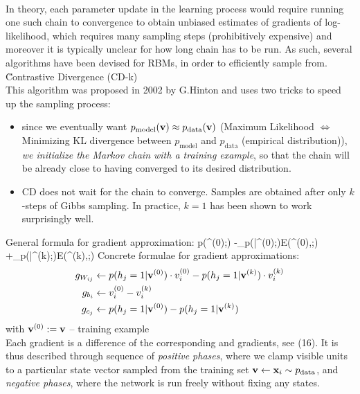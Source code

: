 \\[1em]
In theory, each parameter update in the learning process would require running one such chain to convergence to obtain unbiased estimates of gradients of log-likelihood, which requires many sampling steps (prohibitively expensive) and moreover it is typically unclear for how long chain has to be run. As such, several algorithms have been devised for RBMs, in order to efficiently sample from.
\\[1em]
\u{Contrastive Divergence} (CD-k)
\\
This algorithm was proposed in 2002 by G.Hinton and uses two tricks to speed up the sampling process:
\begin{itemize}
\item since we eventually want $p_{\text{model}}(\mathbf{v}) \approx p_{\text{data}}(\mathbf{v})$ (Maximum Likelihood $\Leftrightarrow$ Minimizing KL divergence between $p_{\text{model}}$ and $p_{\text{data}}$ (empirical distribution)), \emph{we initialize the Markov chain with a training example}, so that the chain will be already close to having converged to its desired distribution.
\item CD does not wait for the chain to converge. Samples are obtained after only $k$-steps of Gibbs sampling. In practice, $k=1$ has been shown to work surprisingly well.
\end{itemize}
General formula for gradient approximation:
\bg
\frac{\partial}{\partial\theta}\log p(^{(0)};\bs{\psi})\approx 
-\sum_{}p(|^{(0)};\bs{\psi})\cdot\frac{\partial}{\partial\theta}E(^{(0)},;\bs{\psi})
+\sum_{}p(|^{(k)};\bs{\psi})\cdot\frac{\partial}{\partial\theta}E(^{(k)},;\bs{\psi})
\eg
Concrete formulae for gradient approximations:
\begin{align}
g_{W_{ij}} &\leftarrow p(h_j=1|\mathbf{v}^{(0)})\cdot v_i^{(0)}-p(h_j=1|\mathbf{v}^{(k)})\cdot v_i^{(k)}
\\
g_{b_i} &\leftarrow v_i^{(0)}-v_i^{(k)}
\\
g_{c_j} &\leftarrow p(h_j=1|\mathbf{v}^{(0)})-p(h_j=1|\mathbf{v}^{(k)})
\end{align}
with $\mathbf{v}^{(0)}:=\mathbf{v}$ -- training example
\\
Each gradient is a difference of the corresponding  and  gradients, see (16). It is thus described through sequence of \emph{positive phases}, where we clamp visible units to a particular state vector sampled from the training set $\mathbf{v}\leftarrow\mathbf{x}_i \sim p_{\text{data}}$, and \emph{negative phases}, where the network is run freely without fixing any states.
